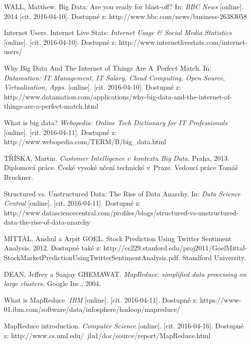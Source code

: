 \documentclass[thesis=B,czech]{FITthesis}[2012/06/26]
\begin{document}
\begin{thebibliography}{1}

 WALL, Matthew. Big Data: Are you ready for blast-off? In: \textit{BBC News} [online]. 2014 [cit. 2016-04-10]. Dostupné z: http://www.bbc.com/news/business-26383058

 Internet Users. Internet Live Stats: \textit{Internet Usage \& Social Media Statistics} [online]. [cit. 2016-04-10]. Dostupné z: http://www.internetlivestats.com/internet-users/

 Why Big Data And The Internet of Things Are A~Perfect Match. In: \textit{Datamation: IT Management, IT Salary, Cloud Computing, Open Source, Virtualization, Apps.} [online]. [cit. 2016-04-10]. Dostupné z: http://www.datamation.com/applications/why-big-data-and-the-internet-of-things-are-a-perfect-match.html

 What is big data? \textit{Webopedia: Online Tech Dictionary for IT Professionals} [online]. [cit. 2016-04-11]. Dostupné z: http://www.webopedia.com/TERM/B/big\_data.html

 TŘÍSKA, Martin. \textit{Customer Intelligence v~kontextu Big Data}. Praha, 2013. Diplomová práce. České vysoké učení technické v~Praze. Vedoucí práce Tomáš Bruckner.

Structured vs. Unstructured Data: The Rise of Data Anarchy. In: \textit{Data Science Central} [online]. [cit. 2016-04-11]. Dostupné z: http://www.datasciencecentral.com/profiles/blogs/structured-vs-unstructured-data-the-rise-of-data-anarchy

MITTAL, Anshul a Arpit GOEL. Stock Prediction Using Twitter Sentiment Analysis. 2012. Dostupné také z: http://cs229.stanford.edu/proj2011/GoelMittal-StockMarketPredictionUsingTwitterSentimentAnalysis.pdf. Standford University.

DEAN, Jeffrey a Sanjay GHEMAWAT. \textit{MapReduce: simplified data processing on large clusters.} Google Inc., 2004.

What is MapReduce. \textit{IBM} [online]. [cit. 2016-04-11]. Dostupné z: https://www-01.ibm.com/software/data/infosphere/hadoop/mapreduce/

MapReduce introduction. \textit{Computer Science} [online]. [cit. 2016-04-16]. Dostupné z: http://www.cs.uml.edu/~jlu1/doc/source/report/MapReduce.html


\end{thebibliography}
\end{document}
